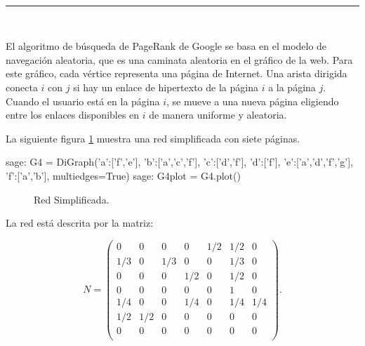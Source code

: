 \begin{center}
	{\fboxrule=4pt } \\
	\rule{15cm}{0pt} \\
\end{center}

\begin{ejer}
    \par El algoritmo de búsqueda de PageRank de Google se basa en el modelo de navegación aleatoria, que es una caminata aleatoria en el gráfico de la web. 
    Para este gráfico, cada vértice representa una página de Internet. Una arista dirigida conecta $i$ con $j$ si hay un enlace de hipertexto de la página $i$ a la página $j$. 
    Cuando el usuario está en la página $i$, se mueve a una nueva página eligiendo entre los enlaces disponibles en $i$ de manera uniforme y aleatoria.
    \par La siguiente figura \ref{redSimplificada} muestra una red simplificada con siete páginas.
\end{ejer}

\begin{sagecommandline}
    sage: G4 = DiGraph({'a':['f','e'], 'b':['a','c','f'], 'c':['d','f'], 'd':['f'], 'e':['a','d','f','g'], 'f':['a','b']}, multiedges=True)
    sage: G4plot = G4.plot()
\end{sagecommandline}
\begin{figure}[H]
	\centering
    \label{redSimplificada}
	\caption{Red Simplificada.}
\end{figure}


\begin{ejer}
    \par La red está descrita por la matriz:
\end{ejer}
\begin{equation}
    N =
    \begin{pmatrix}
    0 & 0 & 0 & 0 & 1/2 & 1/2 & 0\\
    1/3 & 0 & 1/3 & 0 & 0 & 1/3 & 0\\
    0 & 0 & 0 & 1/2 & 0 & 1/2 & 0\\
    0 & 0 & 0 & 0 & 0 & 1 & 0 \\
    1/4 & 0 & 0 & 1/4 & 0 & 1/4 & 1/4 \\
    1/2 & 1/2 & 0 & 0 & 0 & 0 & 0 \\
    0 & 0 & 0 & 0 & 0 & 0 & 0 \\
    \end{pmatrix}
    .
\end{equation}

